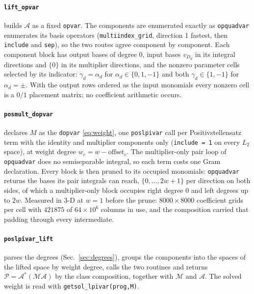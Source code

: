 \documentclass[12pt]{article}
\newcommand{\mcl}[1]{\mathcal{#1}}
\newcommand{\code}[1]{\texttt{#1}}
\theoremstyle{plain}
\theoremstyle{definition}
\theoremstyle{remark}
\begin{document}
\paragraph{\code{lift\_opvar}} builds $\mcl A$ as a fixed \code{opvar}. The components are enumerated exactly as \code{opquadvar} enumerates its basis operators (\code{multiindex\_grid}, direction 1 fastest, then \code{include} and \code{sep}), so the two routes agree component by component. Each component block has output bases of degree $0$, input bases $v_{D_d}$ in its integral directions and $\{0\}$ in its multiplier directions, and the nonzero parameter cells selected by its indicator: $\gamma_d=\alpha_d$ for $\alpha_d\in\{0,1,-1\}$ and both $\gamma_d\in\{1,-1\}$ for $\alpha_d=\pm$. With the output rows ordered as the input monomials every nonzero cell is a $0/1$ placement matrix; no coefficient arithmetic occurs.

\paragraph{\code{posmult\_dopvar}} declares $M$ as the \code{dopvar} \eqref{eq:weight}, one \code{poslpivar} call per Positivstellensatz term with the identity and multiplier components only (\code{include = 1} on every $L_2$ space), at weight degree $w_c=w-\mathrm{offset}_c$. The multiplier-only pair loop of \code{opquadvar} does no semiseparable integral, so each term costs one Gram declaration. Every block is then pruned to its occupied monomials: \code{opquadvar} returns the bases its pair integrals can reach, $\{0,\dots,2w+1\}$ per direction on both sides, of which a multiplier-only block occupies right degree $0$ and left degrees up to $2w$. Measured in 3-D at $w=1$ before the prune: $8000\times8000$ coefficient grids per cell with $421875$ of $64\times10^{6}$ columns in use, and the composition carried that padding through every intermediate.

\paragraph{\code{poslpivar\_lift}} parses the degrees (Sec.~\ref{sec:degrees}), groups the components into the spaces of the lifted space by weight degree, calls the two routines and returns $\mcl P=\mcl A^*(\mcl M\mcl A)$ by the class composition, together with $\mcl M$ and $\mcl A$. The solved weight is read with \code{getsol\_lpivar(prog,M)}.
\end{document}
